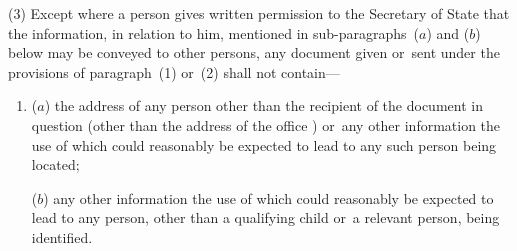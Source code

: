 \documentclass[a4paper,12pt]{article}
\begin{document}
(3) Except where a person gives written permission to the Secretary of State that the information, in relation to him, mentioned in sub-paragraphs~($a$) and ($b$) below may be conveyed to other persons, any document given or~sent under the provisions of paragraph~(1) or~(2) shall not contain—
\begin{enumerate}\item[]
($a$) the address of any person other than the recipient of the document in question (other than the address of the office 
)  %
or~any other information the use of which could reasonably be expected to lead to any such person being located;

($b$) any other information the use of which could reasonably be expected to lead to any person, other than a qualifying child or~a relevant person, being identified.
\end{enumerate}
\end{document}
